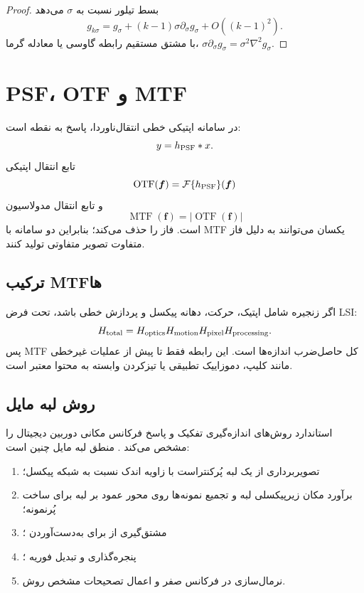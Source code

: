 \documentclass[12pt,openany,oneside]{book}
\newcommand{\vect}[1]{\bm{#1}}
\newcommand{\FT}{\mathcal{F}}
\begin{document}
\begin{proof}
بسط تیلور نسبت به \(\sigma\) می‌دهد
\begin{equation}
g_{k\sigma}=g_\sigma+(k-1)\sigma\partial_\sigma g_\sigma+O((k-1)^2).
\end{equation}
با مشتق مستقیم رابطه گاوسی یا معادله گرما، \(\sigma\partial_\sigma g_\sigma=\sigma^2\nabla^2g_\sigma\).
\end{proof}

\section{PSF، OTF و MTF}

در سامانه اپتیکی خطی انتقال‌ناوردا، پاسخ به نقطه  است:
\begin{equation}
y=h_{\rm PSF}*x.
\end{equation}
تابع انتقال اپتیکی
\begin{equation}
\operatorname{OTF}(\vect f)=\FT\{h_{\rm PSF}\}(\vect f)
\end{equation}
و تابع انتقال مدولاسیون
\begin{equation}
\operatorname{MTF}(\vect f)=|\operatorname{OTF}(\vect f)|
\end{equation}
است.  فاز را حذف می‌کند؛ بنابراین دو سامانه با MTF یکسان می‌توانند به دلیل فاز متفاوت تصویر
متفاوتی تولید کنند.

\subsection{ترکیب MTFها}
اگر زنجیره شامل اپتیک، حرکت، دهانه پیکسل و پردازش خطی باشد، تحت فرض LSI:
\begin{equation}
H_{\rm total}=H_{\rm optics}H_{\rm motion}H_{\rm pixel}H_{\rm processing}.
\end{equation}
پس MTF کل حاصل‌ضرب اندازه‌ها است. این رابطه فقط تا پیش از عملیات غیرخطی مانند کلیپ، دموزاییک تطبیقی یا
تیزکردن وابسته به محتوا معتبر است.

\subsection{روش لبه مایل}
استاندارد  روش‌های اندازه‌گیری تفکیک و پاسخ فرکانس مکانی دوربین دیجیتال را مشخص
می‌کند \cite{iso12233_2024}. منطق لبه مایل چنین است:
\begin{enumerate}
\item تصویربرداری از یک لبه پُرکنتراست با زاویه اندک نسبت به شبکه پیکسل؛
\item برآورد مکان زیرپیکسلی لبه و تجمیع نمونه‌ها روی محور عمود بر لبه برای ساخت  پُرنمونه؛
\item مشتق‌گیری از  برای به‌دست‌آوردن ؛
\item پنجره‌گذاری و تبدیل فوریه ؛
\item نرمال‌سازی در فرکانس صفر و اعمال تصحیحات مشخص روش.
\end{enumerate}
\end{document}
